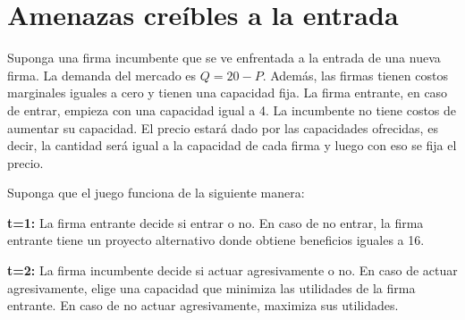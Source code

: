 \documentclass{exam}
\begin{document}
\section{Amenazas creíbles a la entrada}
Suponga una firma incumbente que se ve enfrentada a la entrada de una nueva firma. La demanda del mercado es \( Q = 20 - P \). Además, las firmas tienen costos marginales iguales a cero y tienen una capacidad fija. La firma entrante, en caso de entrar, empieza con una capacidad igual a 4. La incumbente no tiene costos de aumentar su capacidad. El precio estará dado por las capacidades ofrecidas, es decir, la cantidad será igual a la capacidad de cada firma y luego con eso se fija el precio.

Suponga que el juego funciona de la siguiente manera:

\textbf{t=1:} La firma entrante decide si entrar o no. En caso de no entrar, la firma entrante tiene un proyecto alternativo donde obtiene beneficios iguales a 16.

\vspace{3mm}

\noindent\textbf{t=2:} La firma incumbente decide si actuar agresivamente o no. En caso de actuar agresivamente, elige una capacidad que minimiza las utilidades de la firma entrante. En caso de no actuar agresivamente, maximiza sus utilidades.
\end{document}
